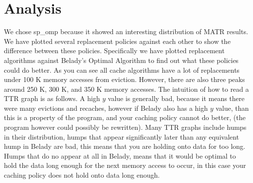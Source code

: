 \section{Analysis}


We chose sp\_omp because it showed an interesting distribution of MATR results.
We have plotted several replacement policies against each other to show the difference between these policies.
Specifically we have plotted replacement algorithms against Belady's Optimal Algorithm to find out what these policies could do better.
As you can see all cache algorithms have a lot of replacements under 100 K memory accesses from eviction.
However, there are also three peaks around 250 K, 300 K, and 350 K memory accesses.
The intuition of how to read a TTR graph is as follows.
A high $y$ value is generally bad, because it means there were many evictions and recaches,
 however if Belady also has a high $y$ value, than this is a property of the program, and your caching policy cannot do better,
 (the program however could possibly be rewritten).
Many TTR graphs include humps in their distribution, humps that appear significantly later than any equivalent hump in Belady are bad,
 this means that you are holding onto data for too long.
Humps that do no appear at all in Belady, means that it would be optimal to hold the data long enough for the next memory access to occur,
 in this case your caching policy does not hold onto data long enough.

